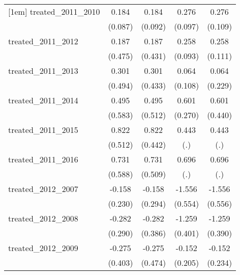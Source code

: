 {\begin{tabular}{l*{4}{c}}
[1em]
treated\_2011\_2010&       0.184\sym{*}  &       0.184\sym{*}  &       0.276\sym{**} &       0.276\sym{*}  \\
            &     (0.087)         &     (0.092)         &     (0.097)         &     (0.109)         \\
[1em]
treated\_2011\_2012&       0.187         &       0.187         &       0.258\sym{**} &       0.258\sym{*}  \\
            &     (0.475)         &     (0.431)         &     (0.093)         &     (0.111)         \\
[1em]
treated\_2011\_2013&       0.301         &       0.301         &       0.064         &       0.064         \\
            &     (0.494)         &     (0.433)         &     (0.108)         &     (0.229)         \\
[1em]
treated\_2011\_2014&       0.495         &       0.495         &       0.601\sym{*}  &       0.601         \\
            &     (0.583)         &     (0.512)         &     (0.270)         &     (0.440)         \\
[1em]
treated\_2011\_2015&       0.822         &       0.822         &       0.443         &       0.443         \\
            &     (0.512)         &     (0.442)         &         (.)         &         (.)         \\
[1em]
treated\_2011\_2016&       0.731         &       0.731         &       0.696         &       0.696         \\
            &     (0.588)         &     (0.509)         &         (.)         &         (.)         \\
[1em]
treated\_2012\_2007&      -0.158         &      -0.158         &      -1.556\sym{**} &      -1.556\sym{**} \\
            &     (0.230)         &     (0.294)         &     (0.554)         &     (0.556)         \\
[1em]
treated\_2012\_2008&      -0.282         &      -0.282         &      -1.259\sym{**} &      -1.259\sym{**} \\
            &     (0.290)         &     (0.386)         &     (0.401)         &     (0.390)         \\
[1em]
treated\_2012\_2009&      -0.275         &      -0.275         &      -0.152         &      -0.152         \\
            &     (0.403)         &     (0.474)         &     (0.205)         &     (0.234)         \\

\end{tabular}}
